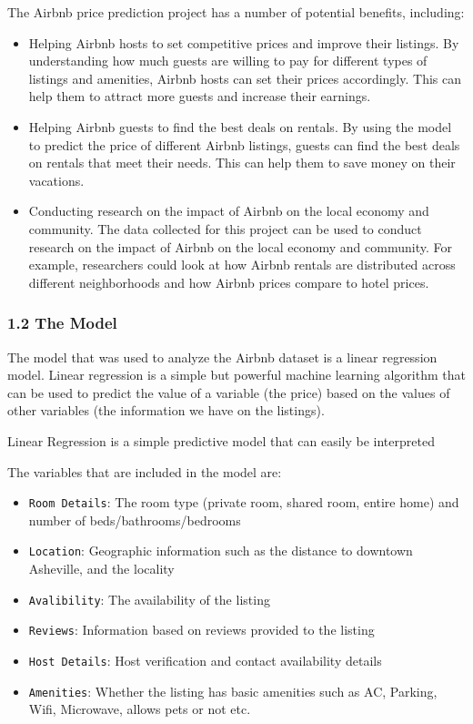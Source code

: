 \documentclass[
  letterpaper,
  DIV=11,
  numbers=noendperiod]{scrartcl}
\providecommand{\tightlist}{%
  \setlength{\itemsep}{0pt}\setlength{\parskip}{0pt}}\usepackage{longtable,booktabs,array}
\begin{document}
The Airbnb price prediction project has a number of potential benefits,
including:

\begin{itemize}
\tightlist
\item
  Helping Airbnb hosts to set competitive prices and improve their
  listings. By understanding how much guests are willing to pay for
  different types of listings and amenities, Airbnb hosts can set their
  prices accordingly. This can help them to attract more guests and
  increase their earnings.
\item
  Helping Airbnb guests to find the best deals on rentals. By using the
  model to predict the price of different Airbnb listings, guests can
  find the best deals on rentals that meet their needs. This can help
  them to save money on their vacations.
\item
  Conducting research on the impact of Airbnb on the local economy and
  community. The data collected for this project can be used to conduct
  research on the impact of Airbnb on the local economy and community.
  For example, researchers could look at how Airbnb rentals are
  distributed across different neighborhoods and how Airbnb prices
  compare to hotel prices.
\end{itemize}

\hypertarget{the-model}{%
\subsubsection{1.2 The Model}\label{the-model}}

The model that was used to analyze the Airbnb dataset is a linear
regression model. Linear regression is a simple but powerful machine
learning algorithm that can be used to predict the value of a variable
(the price) based on the values of other variables (the information we
have on the listings).

Linear Regression is a simple predictive model that can easily be
interpreted

The variables that are included in the model are:

\begin{itemize}
\tightlist
\item
  \texttt{Room\ Details}: The room type (private room, shared room,
  entire home) and number of beds/bathrooms/bedrooms
\item
  \texttt{Location}: Geographic information such as the distance to
  downtown Asheville, and the locality
\item
  \texttt{Avalibility}: The availability of the listing
\item
  \texttt{Reviews}: Information based on reviews provided to the listing
\item
  \texttt{Host\ Details}: Host verification and contact availability
  details
\item
  \texttt{Amenities}: Whether the listing has basic amenities such as
  AC, Parking, Wifi, Microwave, allows pets or not etc.
\end{itemize}
\end{document}
